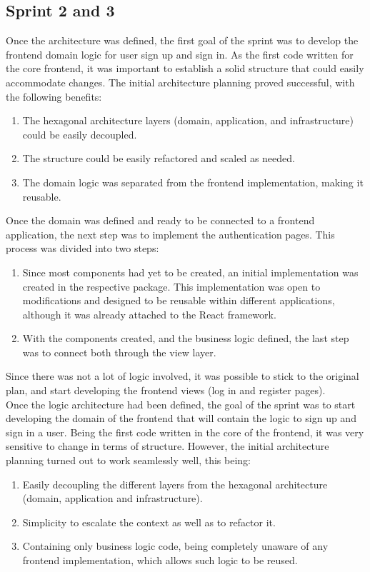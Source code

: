 \documentclass[../memory.tex]{subfiles}
\begin{document}
\subsection{Sprint 2 and 3}
Once the architecture was defined, the first goal of the sprint was to develop
the frontend domain logic for user sign up and sign in. As the first code
written for the core frontend, it was important to establish a solid structure
that could easily accommodate changes. The initial architecture planning proved
successful, with the following benefits:
\begin{enumerate}[label = -]
	\item The hexagonal architecture layers (domain, application, and
	      infrastructure) could be easily decoupled.
	\item The structure could be easily refactored and scaled as needed.
	\item The domain logic was separated from the frontend implementation, making
	      it reusable.
\end{enumerate}
Once the domain was defined and ready to be connected to a frontend application,
the next step was to implement the authentication pages. This process was
divided into two steps:
\begin{enumerate}[label = \arabic{*}.]
	\item Since most components had yet to be created, an initial implementation
	      was created in the respective package. This implementation was open to
	      modifications and designed to be reusable within different applications,
	      although it was already attached to the React framework.
	\item With the components created, and the business logic defined, the last
	      step was to connect both through the view layer.
\end{enumerate}
Since there was not a lot of logic involved, it was possible to stick to the
original plan, and start developing the frontend views (log in and register
pages).
\\[8pt]
Once the logic architecture had been defined, the goal of the sprint was to start
developing the domain of the frontend that will contain the logic to sign up and
sign in a user. Being the first code written in the core of the frontend, it was
very sensitive to change in terms of structure. However, the initial
architecture planning turned out to work seamlessly well, this being:
\begin{enumerate}[label = -]
	\item Easily decoupling the different layers from the hexagonal architecture
	      (domain, application and infrastructure).
	\item Simplicity to escalate the context as well as to refactor it.
	\item Containing only business logic code, being completely unaware of any
	      frontend implementation, which allows such logic to be reused.
\end{enumerate}
\end{document}

